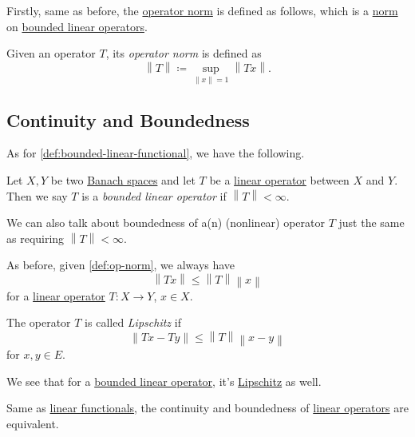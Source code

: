Firstly, same as before, the \hyperref[def:op-norm]{operator norm} is defined as follows, which is a \hyperref[def:norm]{norm} on \hyperref[def:bounded-linear-op]{bounded linear operators}.

\begin{definition}\label{def:op-norm}
	Given an operator \(T\), its \emph{operator norm} is defined as
	\[
		\left\lVert T\right\rVert \coloneqq \sup _{\left\lVert x\right\rVert = 1} \left\lVert Tx\right\rVert.
	\]
\end{definition}

\subsection{Continuity and Boundedness}
As for \autoref{def:bounded-linear-functional}, we have the following.
\begin{definition*}\label{def:bounded-linear-op}
	Let \(X, Y\) be two \hyperref[def:Banach-space]{Banach spaces} and let \(T\) be a \hyperref[def:linear-op]{linear operator} between \(X\) and \(Y\). Then we say \(T\) is a \emph{bounded linear operator} if \(\left\lVert T\right\rVert < \infty \).
\end{definition*}

\begin{remark}\label{rmk:bounded-op}
	We can also talk about boundedness of a(n) (nonlinear) operator \(T\) just the same as requiring \(\left\lVert T\right\rVert < \infty \).
\end{remark}

As before, given \autoref{def:op-norm}, we always have
\[
	\left\lVert Tx\right\rVert \leq \left\lVert T\right\rVert \left\lVert x\right\rVert
\]
for a \hyperref[def:linear-op]{linear operator} \(T\colon X\to Y\), \(x\in X\).

\begin{definition}[Lipschitz]\label{def:Lipschitz}
	The operator \(T\) is called \emph{Lipschitz} if
	\[
		\left\lVert Tx - Ty\right\rVert \leq \left\lVert T\right\rVert \left\lVert x - y\right\rVert
	\]
	for \(x, y\in E\).
\end{definition}

We see that for a \hyperref[def:bounded-linear-op]{bounded linear operator}, it's \hyperref[def:Lipschitz]{Lipschitz} as well.

\begin{remark}
	Same as \hyperref[def:linear-functional]{linear functionals}, the continuity and boundedness of \hyperref[def:linear-op]{linear operators} are equivalent.
\end{remark}

